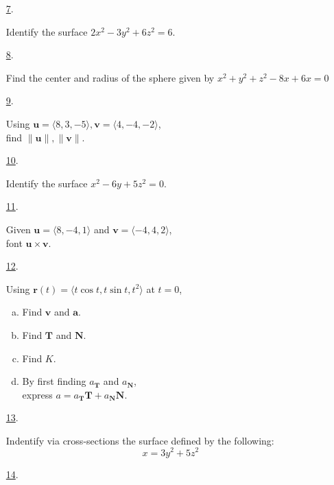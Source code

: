 \documentclass[fleqn]{article}
\renewcommand{\vec}[1]{\mathbf{#1}}
\begin{document}
\begin{itemize}
\item[\hyperlink{7-answer}{7}.]\hypertarget{7-problem}{}

Identify the surface \(2x^2-3y^2+6z^2=6\).
\smallskip

\item[\hyperlink{8-answer}{8}.]\hypertarget{8-problem}{}

Find the center and radius of the sphere given by $x^2+y^2+z^2-8x+6x=0$
\smallskip

\item[\hyperlink{9-answer}{9}.]\hypertarget{9-problem}{}

Using $\mathbf u=\langle 8,3,-5\rangle,\mathbf v=\langle 4,-4,-2\rangle$,\\
find $\|\mathbf u\|,\|\mathbf v\|$.
\smallskip

\item[\hyperlink{10-answer}{10}.]\hypertarget{10-problem}{}

Identify the surface \(x^2-6y+5z^2=0\).
\smallskip

\item[\hyperlink{11-answer}{11}.]\hypertarget{11-problem}{}

Given $\vec u=\langle 8,-4,1\rangle$ and $\vec v=\langle -4,4,2\rangle$,\\
font $\vec u\times\vec v$.
\smallskip

\item[\hyperlink{12-answer}{12}.]\hypertarget{12-problem}{}

Using \(\vec r(t)=\langle t\cos t,t\sin t,t^2\rangle\) at \(t=0\),
\begin{enumerate}[a.]
  \item Find \(\vec v\) and \(\vec a\).
  \item Find \(\vec T\) and \(\vec N\).
  \item Find \(K\).
  \item By first finding \(a_{\vec T}\) and \(a_{\vec N}\),\\
    express \(a=a_{\vec T}\vec T+a_{\vec N}\vec N\).
\end{enumerate}
\smallskip

\item[\hyperlink{13-answer}{13}.]\hypertarget{13-problem}{}

Indentify via cross-sections the surface defined by the following:
$$ x=3y^2+5z^2 $$
\smallskip

\item[\hyperlink{14-answer}{14}.]\hypertarget{14-problem}{}


\end{itemize}
\end{document}
